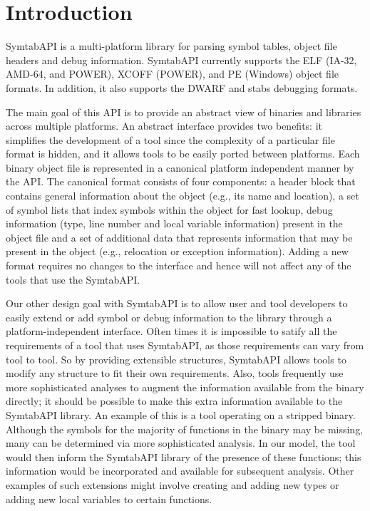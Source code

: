 \section{Introduction}
\label{sec:intro}

SymtabAPI is a multi-platform library for parsing symbol tables,
object file headers and debug information. SymtabAPI currently
supports the ELF (IA-32, AMD-64, and POWER), XCOFF (POWER), and PE
(Windows) object file formats. In addition, it also supports the DWARF
and stabs debugging formats.

The main goal of this API is to provide an abstract view of binaries and
libraries across multiple platforms. An abstract interface provides two
benefits: it simplifies the development of a tool since the complexity of a
particular file format is hidden, and it allows tools to be easily ported
between platforms. Each binary object file is represented in a canonical
platform independent manner by the API. The canonical format consists of four
components: a header block that contains general information about the object
(e.g., its name and location), a set of symbol lists that index symbols within
the object for fast lookup, debug information (type, line number and local
variable information) present in the object file and a set of additional data
that represents information that may be present in the object (e.g., relocation
or exception information). Adding a new format requires no changes to the
interface and hence will not affect any of the tools that use the SymtabAPI. 

Our other design goal with SymtabAPI is to allow user and tool developers to
easily extend or add symbol or debug information to the library through a
platform-independent interface. Often times it is impossible to satify all the
requirements of a tool that uses SymtabAPI, as those requirements can vary from
tool to tool. So by providing extensible structures, SymtabAPI allows tools to
modify any structure to fit their own requirements. Also, tools frequently use
more sophisticated analyses to augment the information available from the binary
directly; it should be possible to make this extra information available to the
SymtabAPI library. An example of this is a tool operating on a stripped binary.
Although the symbols for the majority of functions in the binary may be missing,
many can be determined via more sophisticated analysis. In our model, the tool
would then inform the SymtabAPI library of the presence of these functions; this
information would be incorporated and available for subsequent analysis. Other
examples of such extensions might involve creating and adding new types or
adding new local variables to certain functions.


